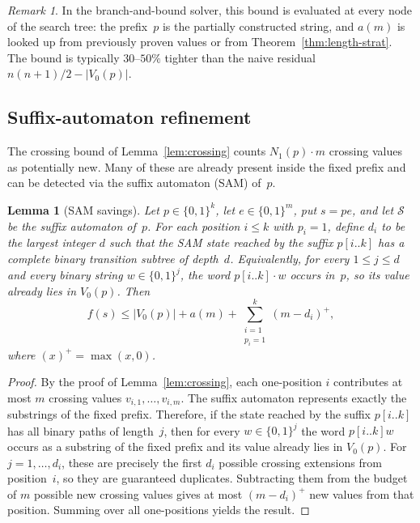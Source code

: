 \documentclass[11pt,a4paper]{article}
\theoremstyle{plain}
\newtheorem{lemma}[theorem]{Lemma}
\theoremstyle{definition}
\theoremstyle{remark}
\newtheorem{remark}[theorem]{Remark}
\newcommand{\ones}{N_1}
\begin{document}
\begin{remark}
  In the branch-and-bound solver, this bound is evaluated at every
  node of the search tree: the prefix~$p$ is the partially
  constructed string, and $a(m)$ is looked up from previously proven
  values or from Theorem~\ref{thm:length-strat}.  The bound is
  typically $30$--$50\%$ tighter than the naive residual
  $n(n{+}1)/2 - |V_0(p)|$.
\end{remark}

\subsection{Suffix-automaton refinement}

The crossing bound of Lemma~\ref{lem:crossing} counts $\ones(p) \cdot m$
crossing values as potentially new.  Many of these are already present
inside the fixed prefix and can be detected via the suffix automaton
(SAM) of~$p$.

\begin{lemma}[SAM savings]\label{lem:sam-savings}
  Let $p \in \{0,1\}^{k}$, let $e \in \{0,1\}^m$, put $s=pe$, and let
  $\mathcal{S}$ be the suffix automaton of~$p$.  For each position
  $i \le k$ with $p_i = 1$, define $d_i$ to be the largest
  integer $d$ such that the SAM state reached by the suffix $p[i..k]$
  has a complete binary transition subtree of depth~$d$.  Equivalently,
  for every $1 \le j \le d$ and every binary string
  $w \in \{0,1\}^j$, the word $p[i..k] \cdot w$ occurs in~$p$, so its
  value already lies in $V_0(p)$.  Then
  \[
    f(s) \le |V_0(p)| + a(m) + \sum_{\substack{i=1 \\ p_i=1}}^{k}
    (m - d_i)^+,
  \]
  where $(x)^+ = \max(x, 0)$.
\end{lemma}

\begin{proof}
  By the proof of Lemma~\ref{lem:crossing}, each one-position
  $i$ contributes at most $m$ crossing values $v_{i,1},\ldots,v_{i,m}$.
  The suffix automaton represents exactly the substrings of the fixed
  prefix.  Therefore, if the state reached by the suffix $p[i..k]$ has
  all binary paths of length~$j$, then for every $w \in \{0,1\}^j$ the
  word $p[i..k]w$ occurs as a substring of the
  fixed prefix and its value already lies in $V_0(p)$.  For
  $j = 1,\ldots,d_i$, these are precisely the first $d_i$ possible
  crossing extensions from position~$i$, so they are guaranteed
  duplicates.  Subtracting them from the budget of $m$ possible new
  crossing values gives at most $(m-d_i)^+$ new values from that
  position.  Summing over all one-positions yields the result.
\end{proof}
\end{document}
